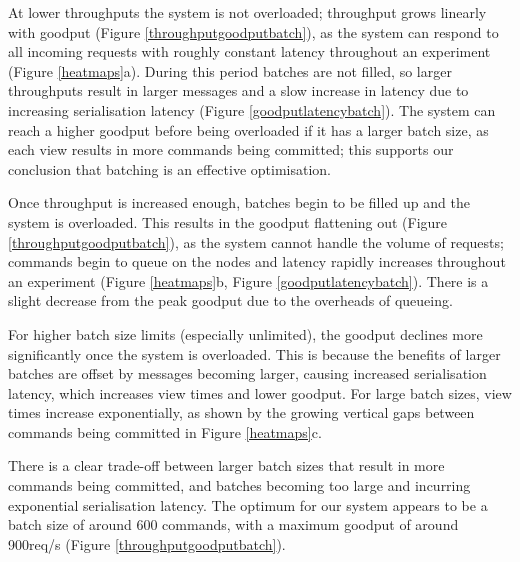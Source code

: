 At lower throughputs the system is not overloaded; throughput grows linearly with goodput (Figure \ref{throughputgoodputbatch}), as the system can respond to all incoming requests with roughly constant latency throughout an experiment (Figure \ref{heatmaps}a). During this period batches are not filled, so larger throughputs result in larger messages and a slow increase in latency due to increasing serialisation latency (Figure \ref{goodputlatencybatch}). The system can reach a higher goodput before being overloaded if it has a larger batch size, as each view results in more commands being committed; this supports our conclusion that batching is an effective optimisation.

Once throughput is increased enough, batches begin to be filled up and the system is overloaded. This results in the goodput flattening out (Figure \ref{throughputgoodputbatch}), as the system cannot handle the volume of requests; commands begin to queue on the nodes and latency rapidly increases throughout an experiment (Figure \ref{heatmaps}b, Figure \ref{goodputlatencybatch}). There is a slight decrease from the peak goodput due to the overheads of queueing.

For higher batch size limits (especially unlimited), the goodput declines more significantly once the system is overloaded. This is because the benefits of larger batches are offset by messages becoming larger, causing increased serialisation latency, which increases view times and lower goodput. For large batch sizes, view times increase exponentially, as shown by the growing vertical gaps between commands being committed in Figure \ref{heatmaps}c.

There is a clear trade-off between larger batch sizes that result in more commands being committed, and batches becoming too large and incurring exponential serialisation latency. The optimum for our system appears to be a batch size of around 600 commands, with a maximum goodput of around 900req/s (Figure \ref{throughputgoodputbatch}).


